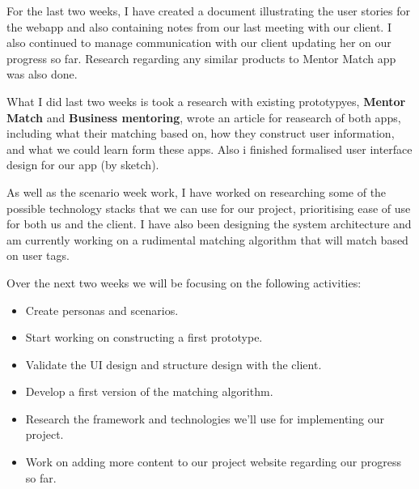\documentclass[11pt]{report}
\begin{document}
\bigskip
{}
\smallskip

\noindent
For the last two weeks, I have created a document illustrating the user stories for the webapp and also containing notes from our last meeting with our client. I also continued to manage communication with our client updating her on our progress so far. Research regarding any similar products to Mentor Match app was also done.\\

\bigskip
{}
\smallskip

\noindent
What I did last two weeks is took a research with existing prototypyes, \textbf{Mentor Match} and \textbf{Business mentoring}, wrote an article for reasearch of both apps, including what their matching based on, how they construct user information, and what we could learn form these apps. Also i finished formalised user interface design for our app (by sketch).

\pagebreak
\bigskip
{}
\smallskip

\noindent
As well as the scenario week work, I have worked on researching some of the possible technology stacks that we can use for our project, prioritising ease of use for both us and the client. I have also been designing the system architecture and am currently working on a rudimental matching algorithm that will match based on user tags.\\

\bigskip
{}
\smallskip

\noindent
Over the next two weeks we will be focusing on the following activities:

\begin{itemize}
  \item Create personas and scenarios.
  \item Start working on constructing a first prototype.
  \item Validate the UI design and structure design with the client.
  \item Develop a first version of the matching algorithm.
  \item Research the framework and technologies we'll use for implementing our project.
  \item Work on adding more content to our project website regarding our progress so far.
\end{itemize}
\end{document}
